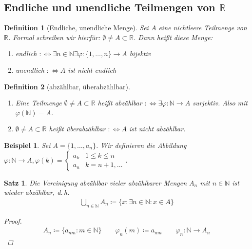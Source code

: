 \documentclass[ngerman,titlepage,twoside, parskip=half*]{scrreprt}
\newcommand*{\N}{\mathbb{N}}
\newcommand*{\R}{\mathbb{R}}
\newcommand*{\perdef}{:\Leftrightarrow}
\theoremstyle{break}
\newtheorem{theorem}{Satz}[section]
\newtheorem{definition}{Definition}[chapter]
\theoremstyle{nonumberbreak}
\newtheorem{beispiel}{Beispiel}
\newtheorem{proof}{Beweis:}
\begin{document}
\subsection{Endliche und unendliche Teilmengen von \texorpdfstring{$\R$}{R}}
\begin{definition}[Endliche, unendliche Menge]
  Sei $A$ eine nichtleere Teilmenge von $\R$. Formal schreiben wir hierfür:
  $\emptyset \neq A \subset \R$. Dann heißt diese Menge:
  \begin{enumerate}
  \item endlich $\perdef \exists n \in \N \exists
    \varphi \colon \{1, \ldots , n\} \rightarrow A$ bijektiv
  \item unendlich $\perdef A$ ist nicht endlich
  \end{enumerate}
\end{definition}

\begin{definition}[abzählbar, überabzählbar]
  \begin{enumerate}
  \item Eine Teilmenge $\emptyset \neq A \subset \R$ heißt abzählbar
    $\perdef \exists \varphi \colon \N \rightarrow A$ surjektiv. Also mit
    $\varphi (\N)=A$.
  \item $\emptyset \neq A \subset \R$ heißt überabzählbar $\perdef A$ ist
    nicht abzählbar.
  \end{enumerate}
\end{definition}

\begin{beispiel}
  Sei $A=\{1,\ldots ,a_n\}$. Wir definieren die Abbildung $\varphi \colon \N
  \rightarrow A, \varphi (k) =
    \begin{cases}
      a_k &  1 \leq k \leq n\\
      a_n &  k=n+1,\ldots
    \end{cases}$.
\end{beispiel}

\begin{theorem}
  Die Vereinigung abzählbar vieler abzählbarer Mengen $A_n$ mit $n \in \N$
  ist wieder abzählbar, d.\,h.
  \begin{gather*}
    \bigcup_{n \in \N} A_n \coloneqq \{x \colon \exists n \in \N \colon x \in A\}
  \end{gather*}
\begin{proof}
  \begin{gather*}
    A_n \coloneqq\{a_{nm}\colon m\in \N\} \qquad \varphi_n(m)\coloneqq a_{nm} \qquad
    \varphi_n\colon\N \rightarrow A_n
  \end{gather*}
\end{proof}
\end{theorem}
\end{document}
